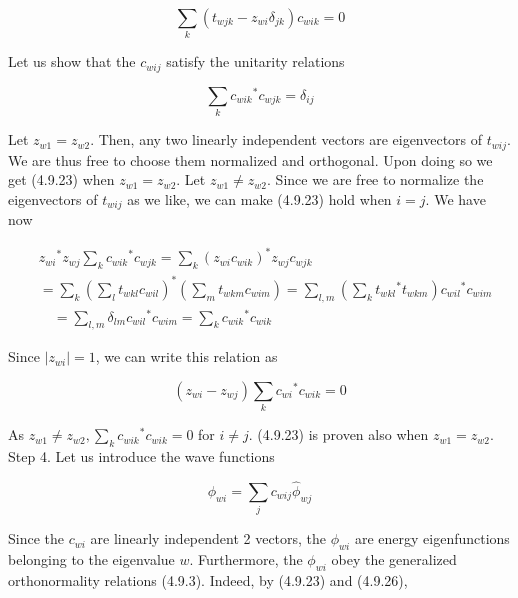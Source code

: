 \documentclass{article}
\begin{document}
\begin{equation*}
\sum_{k}\left(t_{w j k}-z_{w i} \delta_{j k}\right) c_{w i k}=0 \tag{4.9.22}
\end{equation*}
 

Let us show that the $c_{w i j}$ satisfy the unitarity relations
 
\begin{equation*}
\sum_{k} c_{w i k}{ }^{*} c_{w j k}=\delta_{i j} \tag{4.9.23}
\end{equation*}
 

Let $z_{w 1}=z_{w 2}$. Then, any two linearly independent vectors are eigenvectors of $t_{w i j}$. We are thus free to choose them normalized and orthogonal. Upon doing so we get (4.9.23) when $z_{w 1}=z_{w 2}$. Let $z_{w 1} \neq z_{w 2}$. Since we are free to normalize the eigenvectors of $t_{w i j}$ as we like, we can make (4.9.23) hold when $i=j$. We have now
 
\begin{align*}
& z_{w i}{ }^{*} z_{w j} \sum_{k} c_{w i k}{ }^{*} c_{w j k}=\sum_{k}\left(z_{w i} c_{w i k}\right)^{*} z_{w j} c_{w j k}  \tag{4.9.24}\\
& =\sum_{k}\left(\sum_{l} t_{w k l} c_{w i l}\right)^{*}\left(\sum_{m} t_{w k m} c_{w i m}\right)=\sum_{l, m}\left(\sum_{k} t_{w k l}{ }^{*} t_{w k m}\right) c_{w i l}{ }^{*} c_{w i m} \\
& \quad=\sum_{l, m} \delta_{l m} c_{w i l}{ }^{*} c_{w i m}=\sum_{k} c_{w i k}{ }^{*} c_{w i k}
\end{align*}
 

Since $\left|z_{w i}\right|=1$, we can write this relation as
 
\begin{equation*}
\left(z_{w i}-z_{w j}\right) \sum_{k} c_{w i}{ }^{*} c_{w i k}=0 \tag{4.9.25}
\end{equation*}
 

As $z_{w 1} \neq z_{w 2}, \sum_{k} c_{w i k}{ }^{*} c_{w i k}=0$ for $i \neq j$. (4.9.23) is proven also when $z_{w 1}=z_{w 2}$.
Step 4. Let us introduce the wave functions
 
\begin{equation*}
\phi_{w i}=\sum_{j} c_{w i j} \hat{\phi}_{w j} \tag{4.9.26}
\end{equation*}
 

Since the $c_{w i}$ are linearly independent 2 vectors, the $\phi_{w i}$ are energy eigenfunctions belonging to the eigenvalue $w$. Furthermore, the $\phi_{w i}$ obey the generalized orthonormality relations (4.9.3). Indeed, by (4.9.23) and (4.9.26),
 
\end{document}
